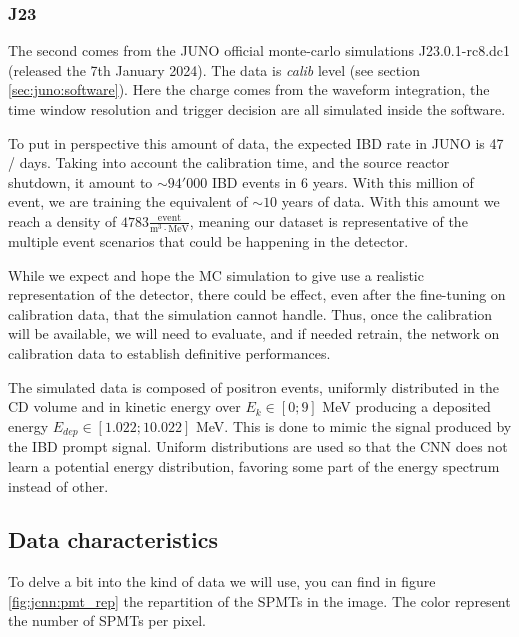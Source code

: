 \documentclass[../main.tex]{subfiles}
\begin{document}
\subsubsection{J23}

The second comes from the JUNO official monte-carlo simulations J23.0.1-rc8.dc1 (released the 7th January 2024). The data is \textit{calib} level (see section \ref{sec:juno:software}). Here the charge comes from the waveform integration, the time window resolution and trigger decision are all simulated inside the software.

To put in perspective this amount of data, the expected IBD rate in JUNO is 47 / days. Taking into account the calibration time, and the source reactor shutdown, it amount to $\sim 94'000$ IBD events in 6 years. With this million of event, we are training the equivalent of $\sim 10$ years of data. With this amount we reach a density of $4783 \frac{\mathrm{event}}{\mathrm{m}^3\cdot\mathrm{MeV}}$, meaning our dataset is representative of the multiple event scenarios that could be happening in the detector.

While we expect and hope the MC simulation to give use a realistic representation of the detector, there could be effect, even after the fine-tuning on calibration data, that the simulation cannot handle. Thus, once the calibration will be available, we will need to evaluate, and if needed retrain, the network on calibration data to establish definitive performances.

The simulated data is composed of positron events, uniformly distributed in the CD volume and in kinetic energy over $E_k \in [0; 9]$ MeV producing a deposited energy $E_{dep} \in [1.022; 10.022]$ MeV. This is done to mimic the signal produced by the IBD prompt signal. Uniform distributions are used so that the CNN does not learn a potential energy distribution, favoring some part of the energy spectrum instead of other.

\subsection{Data characteristics}

To delve a bit into the kind of data we will use, you can find in figure \ref{fig:jcnn:pmt_rep} the repartition of the SPMTs in the image. The color represent the number of SPMTs per pixel.
\end{document}
